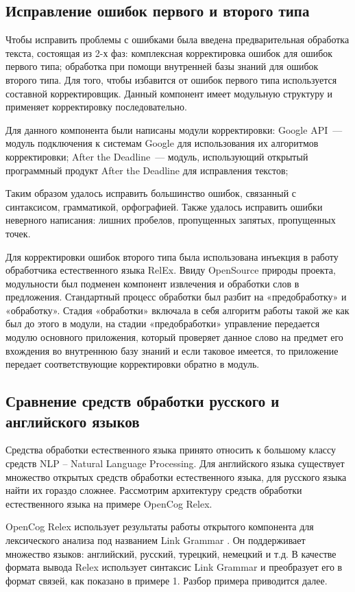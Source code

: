  
\clearpage
\subsection{Исправление ошибок первого и второго типа} \label{sect2_2}
Чтобы исправить проблемы с ошибками была введена предварительная обработка текста, состоящая из 2-х фаз: комплексная корректировка ошибок для ошибок первого типа; обработка при помощи внутренней базы знаний для ошибок второго типа. 
Для того, чтобы избавится от ошибок первого типа используется составной корректировщик. Данный компонент имеет модульную структуру и применяет корректировку последовательно.

Для данного компонента были написаны модули корректировки: Google API~--- модуль подключения к системам Google для использования их алгоритмов корректировки; After the Deadline~--- модуль, использующий открытый программный продукт After the Deadline для исправления текстов; 

Таким образом удалось исправить большинство ошибок, связанный с синтаксисом, грамматикой, орфографией. Также удалось исправить ошибки неверного написания: лишних пробелов, пропущенных запятых, пропущенных точек. \par

Для корректировки ошибок второго типа была использована инъекция в работу обработчика естественного языка RelEx. Ввиду OpenSource природы проекта, модульности был подменен компонент извлечения и обработки слов в предложения. Стандартный процесс обработки был разбит на «предобработку» и «обработку». Стадия «обработки» включала в себя алгоритм работы такой же как был до этого в модули, на стадии «предобработки» управление передается модулю основного приложения, который проверяет данное слово на предмет его вхождения во внутреннюю базу знаний и если таковое имеется, то приложение передает соответствующие корректировки обратно в модуль.

\clearpage
\subsection{Сравнение средств обработки русского и английского языков} \label{sect2_3}
Средства обработки естественного языка принято относить к большому классу средств NLP – Natural Language Processing. Для английского языка существует множество открытых средств обработки естественного языка, для русского языка найти их гораздо сложнее. Рассмотрим архитектуру средств обработки естественного языка на примере OpenCog Relex. \par
OpenCog Relex использует результаты работы открытого компонента для лексического анализа под названием Link Grammar \cite{linkgrammar}. Он поддерживает множество языков: английский, русский, турецкий, немецкий и т.д.  В качестве формата вывода Relex использует синтаксис Link Grammar и преобразует его в формат связей, как показано в примере 1. Разбор примера приводится далее. 

